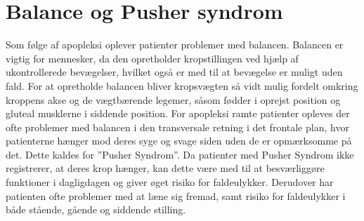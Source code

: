 \section{Balance og Pusher syndrom}
Som følge af apopleksi oplever patienter problemer med balancen. Balancen er vigtig for mennesker, da den opretholder kropstillingen ved hjælp af ukontrollerede bevægelser, hvilket også er med til at bevægelse er muligt uden fald. For at opretholde balancen bliver kropsvægten så vidt mulig fordelt omkring kroppens akse og de vægtbærende legemer, såsom fødder i oprejst position og gluteal musklerne i siddende position.\citep{Nichols1997}   
For apopleksi ramte patienter opleves der ofte problemer med balancen i den transversale retning i det frontale plan, hvor patienterne hænger mod deres syge og svage siden uden de er opmærksomme på det. Dette kaldes for ”Pusher Syndrom”. Da patienter med Pusher Syndrom ikke registrerer, at deres krop hænger, kan dette være med til at besværliggøre funktioner i dagligdagen og giver øget risiko for faldeulykker. Derudover har patienten ofte problemer med at læne sig fremad, samt risiko for faldeulykker i både stående, gående og siddende stilling. \citep{Karnath2003}

